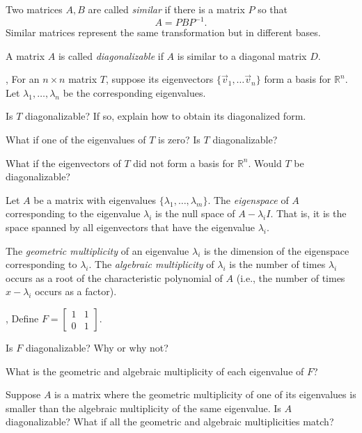 \documentclass[letter]{article}
\newcommand{\R}{\mathbb{R}}
\newcommand{\mat}[1]{\begin{bmatrix}#1\end{bmatrix}}
\begin{document}
	\begin{Def}
	Two matrices $A,B$ are called \emph{similar} if there is a matrix $P$ so that
	\[
		A=PBP^{-1}.
	\]
	Similar matrices represent the same transformation but in different bases.

	A matrix $A$ is called \emph{diagonalizable} if $A$ is similar to 
	a diagonal matrix $D$.
	\end{Def}

	\sep
	For an $n\times n$ matrix $T$, suppose its eigenvectors $\{\vec v_1,\ldots \vec v_n\}$
	form a basis for $\R^n$.  Let $\lambda_1,\ldots,\lambda_n$ be the corresponding
	eigenvalues.
	

	\begin{Enum}
		\item Is $T$ diagonalizable?  If so, explain how to obtain its diagonalized form.
		\item What if one of the eigenvalues of $T$ is zero?  Is $T$ diagonalizable?
		\item What if the eigenvectors of $T$ did not form a basis for $\R^n$.
			Would $T$ be diagonalizable?
	\end{Enum}

	\begin{Def}
	Let $A$ be a matrix with eigenvalues $\{\lambda_1,\ldots,\lambda_m\}$.  The
	\emph{eigenspace} of $A$ corresponding to the eigenvalue $\lambda_i$ is the
	null space of $A-\lambda_i I$.  That is, it is the space spanned by all eigenvectors
	that have the eigenvalue $\lambda_i$.

	The \emph{geometric multiplicity} of an eigenvalue $\lambda_i$ is the dimension
	of the eigenspace corresponding to $\lambda_i$.  The \emph{algebraic multiplicity}
	of $\lambda_i$ is the number of times $\lambda_i$ occurs as a root of the
	characteristic polynomial of $A$ (i.e., the number of times $x-\lambda_i$
	occurs as a factor).
	\end{Def}

	\sep
	Define $F=\mat{1&1\\0&1}$.
	\begin{Enum}
		\item Is $F$ diagonalizable?  Why or why not?
		\item What is the geometric and algebraic multiplicity of each eigenvalue
			of $F$?
		\item Suppose $A$ is a matrix where the geometric multiplicity of one of its eigenvalues
			is smaller than the algebraic multiplicity of the same eigenvalue.  Is
			$A$ diagonalizable?  What if all the geometric and algebraic multiplicities
			match?
	\end{Enum}
\end{document}
